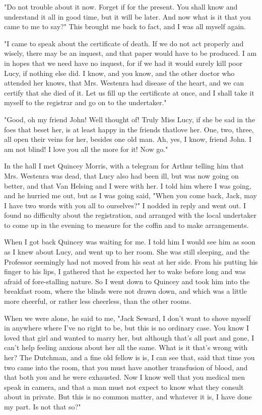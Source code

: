 "Do not trouble about it now. Forget if for the present. You shall know and understand it all in good time, but it will be later. And now what is it that you came to me to say?" This brought me back to fact, and I was all myself again. 

"I came to speak about the certificate of death. If we do not act properly and wisely, there may be an inquest, and that paper would have to be produced. I am in hopes that we need have no inquest, for if we had it would surely kill poor Lucy, if nothing else did. I know, and you know, and the other doctor who attended her knows, that Mrs. Westenra had disease of the heart, and we can certify that she died of it. Let us fill up the certificate at once, and I shall take it myself to the registrar and go on to the undertaker." 

"Good, oh my friend John! Well thought of! Truly Miss Lucy, if she be sad in the foes that beset her, is at least happy in the friends thatlove her. One, two, three, all open their veins for her, besides one old man. Ah, yes, I know, friend John. I am not blind! I love you all the more for it! Now go." 

In the hall I met Quincey Morris, with a telegram for Arthur telling him that Mrs. Westenra was dead, that Lucy also had been ill, but was now going on better, and that Van Helsing and I were with her. I told him where I was going, and he hurried me out, but as I was going said, "When you come back, Jack, may I have two words with you all to ourselves?" I nodded in reply and went out. I found no difficulty about the registration, and arranged with the local undertaker to come up in the evening to measure for the coffin and to make arrangements. 

When I got back Quincey was waiting for me. I told him I would see him as soon as I knew about Lucy, and went up to her room. She was still sleeping, and the Professor seemingly had not moved from his seat at her side. From his putting his finger to his lips, I gathered that he expected her to wake before long and was afraid of fore-stalling nature. So I went down to Quincey and took him into the breakfast room, where the blinds were not drawn down, and which was a little more cheerful, or rather less cheerless, than the other rooms. 

When we were alone, he said to me, "Jack Seward, I don't want to shove myself in anywhere where I've no right to be, but this is no ordinary case. You know I loved that girl and wanted to marry her, but although that's all past and gone, I can't help feeling anxious about her all the same. What is it that's wrong with her? The Dutchman, and a fine old fellow is is, I can see that, said that time you two came into the room, that you must have another transfusion of blood, and that both you and he were exhausted. Now I know well that you medical men speak in camera, and that a man must not expect to know what they consult about in private. But this is no common matter, and whatever it is, I have done my part. Is not that so?" 

